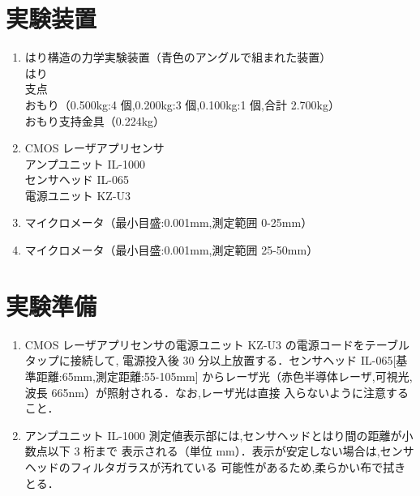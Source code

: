 \documentclass[a4paper,11pt]{jsarticle}
\begin{document}
\section{実験装置}
\begin{enumerate}
  \item はり構造の力学実験装置（青色のアングルで組まれた装置）\\
        はり\\
        支点\\
        おもり（0.500kg:4 個,0.200kg:3 個,0.100kg:1 個,合計 2.700kg）\\
        おもり支持金具（0.224kg）
  \item CMOS レーザアプリセンサ\\
        アンプユニット IL-1000\\
        センサヘッド IL-065\\
        電源ユニット KZ-U3
  \item マイクロメータ（最小目盛:0.001mm,測定範囲 0-25mm）
  \item マイクロメータ（最小目盛:0.001mm,測定範囲 25-50mm）
\end{enumerate}

\section{実験準備}
\begin{enumerate}
  \item CMOS レーザアプリセンサの電源ユニット KZ-U3 の電源コードをテーブルタップに接続して,
        電源投入後 30 分以上放置する．センサヘッド IL-065[基準距離:65mm,測定距離:55-105mm]
        からレーザ光（赤色半導体レーザ,可視光,波長 665nm）が照射される．なお,レーザ光は直接
        入らないように注意すること．
  \item アンプユニット IL-1000 測定値表示部には,センサヘッドとはり間の距離が小数点以下 3 桁まで
        表示される（単位 mm）．表示が安定しない場合は,センサヘッドのフィルタガラスが汚れている
        可能性があるため,柔らかい布で拭きとる．
\end{enumerate}
\end{document}
